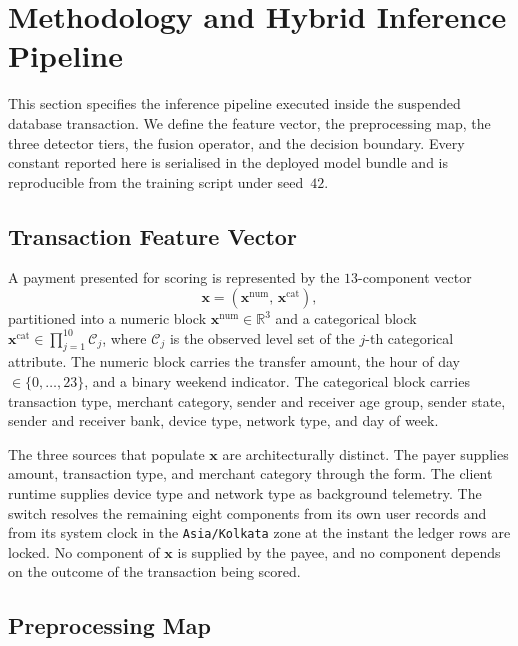 \documentclass[conference]{IEEEtran}
\begin{document}
\section{Methodology and Hybrid Inference Pipeline}
\label{sec:methodology}

This section specifies the inference pipeline executed inside the
suspended database transaction. We define the feature vector, the
preprocessing map, the three detector tiers, the fusion operator, and
the decision boundary. Every constant reported here is serialised in
the deployed model bundle and is reproducible from the training script
under seed~$42$.

\subsection{Transaction Feature Vector}
\label{subsec:features}

A payment presented for scoring is represented by the $13$-component
vector
\begin{equation}
\mathbf{x} = \left(\mathbf{x}^{\mathrm{num}},\,
                   \mathbf{x}^{\mathrm{cat}}\right),
\label{eq:x}
\end{equation}
partitioned into a numeric block
$\mathbf{x}^{\mathrm{num}} \in \mathbb{R}^{3}$ and a categorical block
$\mathbf{x}^{\mathrm{cat}} \in \prod_{j=1}^{10}\mathcal{C}_{j}$, where
$\mathcal{C}_{j}$ is the observed level set of the $j$-th categorical
attribute. The numeric block carries the transfer amount, the hour of
day $\in\{0,\dots,23\}$, and a binary weekend indicator. The
categorical block carries transaction type, merchant category, sender
and receiver age group, sender state, sender and receiver bank, device
type, network type, and day of week.

The three sources that populate $\mathbf{x}$ are architecturally
distinct. The payer supplies amount, transaction type, and merchant
category through the form. The client runtime supplies device type and
network type as background telemetry. The switch resolves the remaining
eight components from its own user records and from its system clock in
the \texttt{Asia/Kolkata} zone at the instant the ledger rows are
locked. No component of $\mathbf{x}$ is supplied by the payee, and no
component depends on the outcome of the transaction being scored.

\subsection{Preprocessing Map}
\label{subsec:preprocessing}
\end{document}
